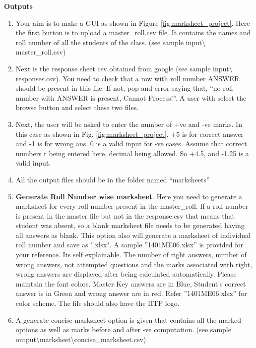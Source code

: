 \documentclass{article}
\begin{document}
\textbf{Outputs}
\begin{enumerate}
	\item Your aim is to make a GUI as shown in Figure 
	\ref{fig:marksheet_project}. Here 
	the first button is to upload a master\_roll.csv file. It contains the 
	names 
	and roll number of all the students of the class. (see sample 
	input\textbackslash  
	master\_roll.csv)
	
	\item Next is the response sheet csv obtained from google  (see sample 
	input\textbackslash  
responses.csv). You need to check that a row with roll number ANSWER should be 
present in this file. If not, pop and error saying that, ``no roll number with 
ANSWER is present, Cannot Process!''. 
A user with select the browse button and select these two files. 

\item Next, the user will be asked to enter the number of +ve and -ve marks. In 
this case as shown in Fig. \ref{fig:marksheet_project}, +5 is for correct 
answer and -1 is for wrong ans. 0 is a valid input for -ve cases. Assume that 
correct numbers r being  entered here, decimal being allowed. So +4.5, and 
-1.25 is a valid input.

\item All the output files should be in the folder named ``marksheets''


\item \textbf{Generate Roll Number wise marksheet}. Here you need to generate a 
marksheet for every roll number present in the master\_roll.  If a roll number 
is present in the master file but not in the 
response.csv that means that student was absent, so a blank marksheet file 
needs to 
be generated having all answers as blank.  This option also will generate a 
marksheet of individual roll 
number and save as ".xlsx". A sample ''1401ME06.xlsx'' is provided for your 
reference. Its self explainable. The number of right answers, number of wrong 
answers, not attempted questions and the marks associated with right, wrong 
answers are displayed after being calculated automatically. Please maintain the 
font colors. Master Key answers are in Blue, Student's correct answer is in 
Green and wrong answer are in red. Refer ''1401ME06.xlsx'' for color scheme. 
The file should also have the IITP logo.

\item A generate concise marksheet option is given that contains all the marked 
options as well as marks before and after -ve computation. (see sample 
output\textbackslash marksheet\textbackslash concise\_marksheet.csv)


\end{enumerate}
\end{document}

